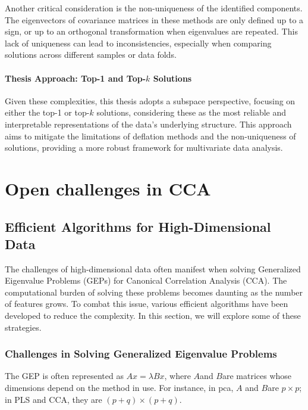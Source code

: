 Another critical consideration is the non-uniqueness of the identified components.
The eigenvectors of covariance matrices in these methods are only defined up to a sign, or up to an orthogonal transformation when eigenvalues are repeated. This lack of uniqueness can lead to inconsistencies, especially when comparing solutions across different samples or data folds.

\paragraph{Thesis Approach: Top-1 and Top-$k$ Solutions}

Given these complexities, this thesis adopts a subspace perspective, focusing on either the top-1 or top-$k$ solutions, considering these as the most reliable and interpretable representations of the data's underlying structure.
This approach aims to mitigate the limitations of deflation methods and the non-uniqueness of solutions, providing a more robust framework for multivariate data analysis.

\section{Open challenges in CCA}

\subsection{Efficient Algorithms for High-Dimensional Data}

The challenges of high-dimensional data often manifest when solving Generalized Eigenvalue Problems (GEPs) for Canonical Correlation Analysis (CCA). The computational burden of solving these problems becomes daunting as the number of features grows. To combat this issue, various efficient algorithms have been developed to reduce the complexity. In this section, we will explore some of these strategies.

\subsubsection{Challenges in Solving Generalized Eigenvalue Problems}

The GEP is often represented as \( Ax = \lambda Bx \), where \( A \)and \( B \)are matrices whose dimensions depend on the method in use.
For instance, in \acrshort{pca}, \( A \) and \( B \)are \( p \times p \); in PLS and CCA, they are \( (p+q) \times (p+q) \).


